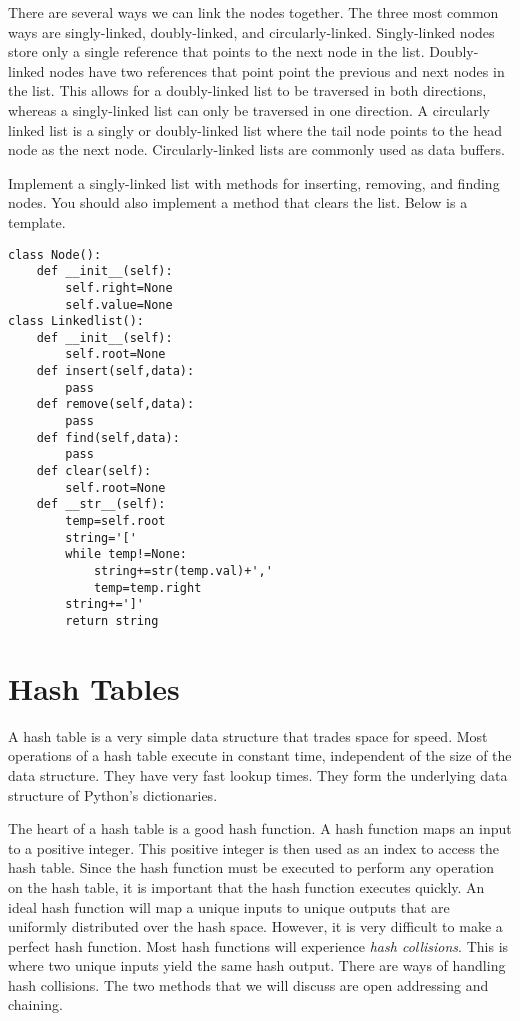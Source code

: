 There are several ways we can link the nodes together.  The three most common ways are singly-linked, doubly-linked, and circularly-linked.  
Singly-linked nodes store only a single reference that points to the next node in the list.  
Doubly-linked nodes have two references that point point the previous and next nodes in the list.  
This allows for a doubly-linked list to be traversed in both directions, whereas a singly-linked list can only be traversed in one direction. 
A circularly linked list is a singly or doubly-linked list where the tail node points to the head node as the next node.  
Circularly-linked lists are commonly used as data buffers.

\begin{problem}
Implement a singly-linked list with methods for inserting, removing, and finding nodes.  You should also implement a method that clears the list. Below is a template.
\begin{lstlisting}
class Node():
    def __init__(self):
        self.right=None
        self.value=None
class Linkedlist():
    def __init__(self):
        self.root=None
    def insert(self,data):
        pass
    def remove(self,data):
        pass
    def find(self,data):
        pass
    def clear(self):
        self.root=None
    def __str__(self):
        temp=self.root
        string='['
        while temp!=None:
            string+=str(temp.val)+','
            temp=temp.right
        string+=']'
        return string
\end{lstlisting}
\end{problem}

\section*{Hash Tables}
A hash table is a very simple data structure that trades space for speed.
Most operations of a hash table execute in constant time, independent of the size of the data structure.  
They have very fast lookup times.  They form the underlying data structure of Python's dictionaries.

The heart of a hash table is a good hash function.  
A hash function maps an input to a positive integer. 
This positive integer is then used as an index to access the hash table. 
Since the hash function must be executed to perform any operation on the hash table, it is important that the hash function executes quickly.
An ideal hash function will map a unique inputs to unique outputs that are uniformly distributed over the hash space. 
However, it is very difficult to make a perfect hash function.  Most hash functions will experience \emph{hash collisions}. 
This is where two unique inputs yield the same hash output.
There are ways of handling hash collisions.  The two methods that we will discuss are open addressing and chaining.

